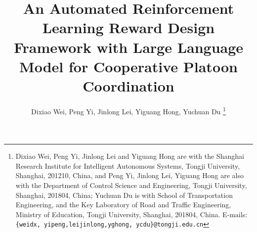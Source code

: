 \documentclass[lettersize,journal]{IEEEtran}
\begin{document}
\title{An Automated Reinforcement Learning Reward Design Framework with Large Language Model for Cooperative Platoon Coordination}

\author{Dixiao Wei, Peng Yi, Jinlong Lei, Yiguang Hong, Yuchuan Du
	\thanks{Dixiao Wei, Peng Yi, Jinlong Lei and Yiguang Hong are with  the Shanghai Research Institute for Intelligent Autonomous Systems, Tongji University, Shanghai, 201210, China, and Peng Yi, Jinlong Lei, Yiguang Hong are also with the Department of Control Science and Engineering, Tongji University,  Shanghai, 201804, China; 
    Yuchuan Du is with School of Transportation Engineering, and the
 Key Laboratory of Road and Traffic Engineering, Ministry of Education, Tongji University, Shanghai, 201804, China.
        E-mails: {\tt\small \{weidx, yipeng,leijinlong,yghong, ycdu\}@tongji.edu.cn}}
}


\maketitle
\end{document}
